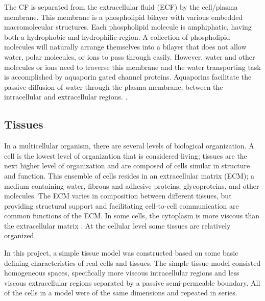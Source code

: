 	The CF is separated from the extracellular fluid (ECF) by the cell/plasma membrane. This membrane is a phospholipid bilayer with various embedded macromolecular structures. Each phospholipid molecule is amphiphatic, having both a hydrophobic and hydrophilic region. A collection of phospholipid molecules will naturally arrange themselves into a bilayer that does not allow water, polar molecules, or ions to pass through easily. However, water and other molecules or ions need to traverse this membrane and the water transporting task is accomplished by aquaporin gated channel proteins. Aquaporins facilitate the passive diffusion of water through the plasma membrane, between the intracellular and extracellular regions. \citep{ap}.
	
	

\subsection{Tissues}
	In a multicellular organism, there are several levels of biological organization. A cell is the lowest level of organization that is considered living; tissues are the next higher level of organization and are composed of cells similar in structure and function. This ensemble of cells resides in an extracellular matrix (ECM); a medium containing water, fibrous and adhesive proteins, glycoproteins, and other molecules. The ECM varies in composition between different tissues, but providing structural support and facilitating cell-to-cell communication are common functions of the ECM. In some cells, the cytoplasm is more viscous than the extracellular matrix \citep{cr-biology}. At the cellular level some tissues are relatively organized.
	
	In this project, a simple tissue model was constructed based on some basic defining characteristics of real cells and tissues. The simple tissue model consisted homogeneous spaces, specifically more viscous intracellular regions and less viscous extracellular regions separated by a passive semi-permeable boundary. All of the cells in a model were of the same dimensions and repeated in series.











